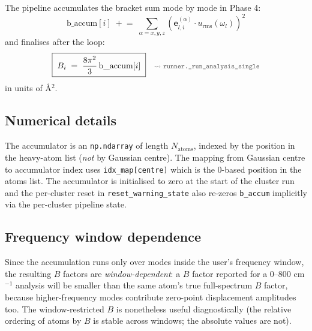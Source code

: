 \documentclass[10pt,a4paper,twoside]{article}
\newcommand{\evec}{\mathbf{e}}
\newcommand{\urms}{u_{\mathrm{rms}}}
\newcommand{\codref}[1]{%
  \quad\text{\textcolor{gray!70!black}{\footnotesize $\rightsquigarrow$~\texttt{#1}}}}
\newcommand{\fn}[1]{\texttt{#1}}
\begin{document}
The pipeline accumulates the bracket sum mode by mode in Phase 4:
\begin{equation}
  \text{b\_accum}[i] \;\mathrel{+}=\;
   \sum_{\alpha = x, y, z} (\evec_{l,i}^{(\alpha)} \cdot \urms(\omega_l))^2
  \label{eq:b-factor-accum}
\end{equation}
and finalises after the loop:
\begin{equation}
  \boxed{\;B_i
    \;=\;
  \frac{8\pi^2}{3}\,\text{b\_accum}[i]\;}
  \codref{runner.\_run\_analysis\_single}
  \label{eq:b-factor-final}
\end{equation}
in units of \AA$^2$.

\subsection{Numerical details}

The accumulator is an \fn{np.ndarray} of length $N_\text{atoms}$,
indexed by the position in the heavy-atom list (\emph{not} by
Gaussian centre). The mapping from Gaussian centre to accumulator
index uses \fn{idx\_map[centre]} which is the 0-based position in
the atoms list. The accumulator is initialised to zero at the start
of the cluster run and the per-cluster reset in
\fn{reset\_warning\_state} also re-zeros \fn{b\_accum} implicitly
via the per-cluster pipeline state.

\subsection{Frequency window dependence}

Since the accumulation runs only over modes inside the user's
frequency window, the resulting $B$ factors are
\emph{window-dependent}: a $B$ factor reported for a 0--800 cm$^{-1}$
analysis will be smaller than the same atom's true full-spectrum
$B$ factor, because higher-frequency modes contribute zero-point
displacement amplitudes too. The window-restricted $B$ is
nonetheless useful diagnostically (the relative ordering of atoms
by $B$ is stable across windows; the absolute values are not).
\end{document}
